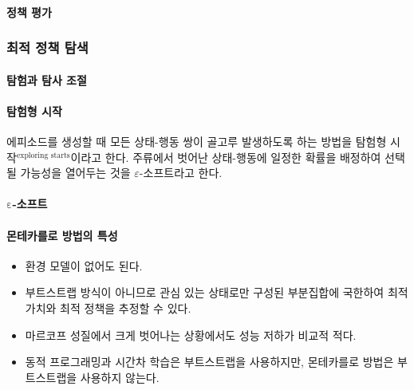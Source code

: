 \documentclass [12pt] {oblivoir}
\let\oldsubsubsection=\subsubsection
\renewcommand{\subsubsection}
{
  \filbreak
  \oldsubsubsection
}
\begin{document}
\paragraph*{정책 평가}\mbox{}

\vspace{3mm}

\subsubsection{최적 정책 탐색}

\paragraph*{탐험과 탐사 조절}\mbox{}

\vspace{3mm}

\paragraph*{탐험형 시작}\mbox{}

에피소드를 생성할 때 모든 상태-행동 쌍이 골고루 발생하도록 하는 방법을 탐험형 시작$^{\text{exploring starts}}$이라고 한다.
주류에서 벗어난 상태-행동에 일정한 확률을 배정하여 선택될 가능성을 열어두는 것을 $\varepsilon$-소프트라고 한다.

\vspace{3mm}

\paragraph*{$\mathbf{\mathrm{\varepsilon}}$-소프트}\mbox{}

\vspace{3mm}

\paragraph*{몬테카를로 방법의 특성}\mbox{}
\begin{itemize}
  \item 환경 모델이 없어도 된다.
  \item 부트스트랩 방식이 아니므로 관심 있는 상태로만 구성된 부분집합에 국한하여 최적 가치와 최적 정책을 추정할 수 있다.
  \item 마르코프 성질에서 크게 벗어나는 상황에서도 성능 저하가 비교적 적다.
  \item 동적 프로그래밍과 시간차 학습은 부트스트랩을 사용하지만, 몬테카를로 방법은 부트스트랩을 사용하지 않는다.
\end{itemize}
\end{document}
